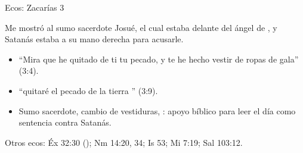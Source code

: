 \begin{frame}{Ecos: Zacarías 3}
\begin{cita}Me mostró al sumo sacerdote Josué, el cual estaba delante del ángel de \SENOR, y Satanás estaba a su mano derecha para acusarle.\end{cita}
\small
\begin{itemize}
\item ``Mira que he quitado de ti tu pecado, y te he hecho vestir de ropas de gala'' (3:4).
\item ``quitaré el pecado de la tierra '' (3:9).
\item Sumo sacerdote, cambio de vestiduras, : apoyo bíblico para leer el día como sentencia contra Satanás.
\end{itemize}
\scriptsize Otros ecos: Éx 32:30 (); Nm 14:20, 34; Is 53; Mi 7:19; Sal 103:12.
\end{frame}

